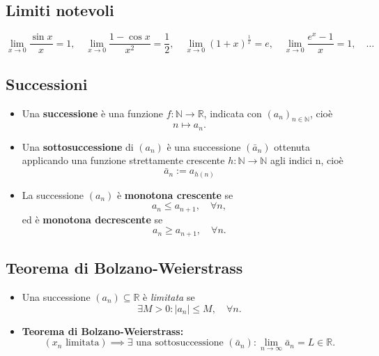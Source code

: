 \documentclass[12pt,a4paper]{article}
\begin{document}
\subsection*{Limiti notevoli}

\[
\lim_{x \to 0} \frac{\sin x}{x} = 1, \quad \lim_{x \to 0} \frac{1 - \cos x}{x^2} = \frac{1}{2},\quad
\lim_{x \to 0} (1 + x)^{\frac{1}{x}} = e, \quad \lim_{x \to 0} \frac{e^x - 1}{x} = 1,\quad\dots\]


\subsection*{Successioni}

\begin{itemize}
    \item Una \textbf{successione} è una funzione \( f : \mathbb{N} \to \mathbb{R} \),  
    indicata con \( (a_n)_{n \in \mathbb{N}} \), cioè  
    \[
    n \mapsto a_n.
    \]

    \item Una \textbf{sottosuccessione} di \( (a_n) \) è una successione \( (\bar{a}_{n}) \) ottenuta applicando  
    una funzione strettamente crescente \( h: \mathbb{N}\to\mathbb{N} \) agli indici n, cioè  
    \[
  \bar{a}_n:=a_{h(n)}
    \]

    \item La successione \( (a_n) \) è \textbf{monotona crescente} se  
    \[
    a_n \leq a_{n+1}, \quad \forall n,
    \]
    ed è \textbf{monotona decrescente} se  
    \[
    a_n \geq a_{n+1}, \quad \forall n.
    \]
\end{itemize}

\subsection*{Teorema di Bolzano-Weierstrass}

\begin{itemize}
    \item Una successione \( (a_n) \subseteq \mathbb{R} \) è \emph{limitata} se  
    \[
    \exists M > 0 : |a_n| \leq M, \quad \forall n.
    \]

    \item \textbf{Teorema di Bolzano-Weierstrass:}  
    \[
    (x_n \text{ limitata}) \implies \exists \text{ una sottosuccessione } (\bar{a}_{n}) : \lim_{n\to \infty} \bar{a}_{n} = L \in \mathbb{R}.
    \]
\end{itemize}
\end{document}
